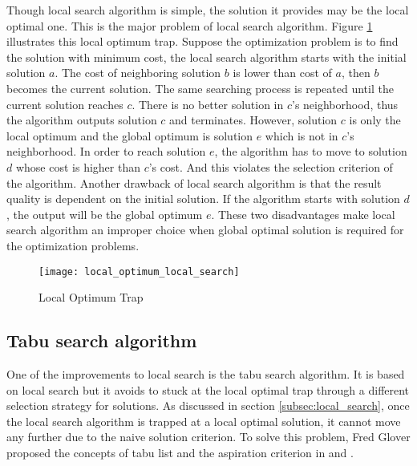 		
		
		Though local search algorithm is simple, the solution it provides may be the local optimal one. This is the major problem of
		local search algorithm. Figure \ref{fig:local_optimum_local_search} illustrates this local optimum trap. Suppose the
		optimization problem is to find the solution with minimum cost, the local search algorithm starts with the initial solution $a$.
		The cost of neighboring solution $b$ is lower than cost of $a$, then $b$ becomes the current solution. The same searching process 
		is repeated until the current solution reaches $c$. There is no better solution in $c$'s neighborhood, thus the algorithm outputs solution $c$ and terminates. However, solution $c$ is only the local optimum and the global optimum is solution $e$ which
		is not in $c$'s neighborhood. In order to reach solution $e$, the algorithm has to move to solution $d$ whose cost is higher than
		$c$'s cost. And this violates the selection criterion of the algorithm. Another drawback of local search algorithm is that the result quality is dependent on the initial solution. If the algorithm starts with solution $d$, the output will be the global optimum $e$. These two disadvantages make local search algorithm an improper choice when global optimal solution is required for 
		the optimization problems.
		
			\begin{figure}[H]
				\begin{center}
					\texttt{[image: local\_optimum\_local\_search]}
					\caption[Local Optimum Trap]{Local Optimum Trap}
					\label{fig:local_optimum_local_search}
				\end{center}
			\end{figure}
		
		\subsection{Tabu search algorithm}
		\label{subsec:tabu_search}
		One of the improvements to local search is the tabu search algorithm. It is based on local search but it avoids to stuck at the
		local optimal trap through a different selection strategy for solutions. As discussed in section \ref{subsec:local_search}, once
		the local search algorithm is trapped at a local optimal solution, it cannot move any further due to the naive solution criterion.
		To solve this problem, Fred Glover proposed the concepts of tabu list and the aspiration criterion in \cite{doi:10.1287/ijoc.1.3.190} and \cite{doi:10.1287/ijoc.2.1.4}.
		
